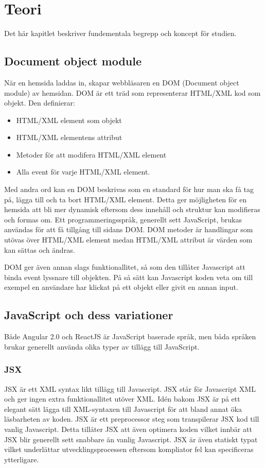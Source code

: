 \section{Teori}
\label{sec:axel-theory}
Det här kapitlet beskriver fundementala begrepp och koncept för studien.

\subsection{Document object module}
När en hemsida laddas in, skapar webbläsaren en DOM (Document object module) av hemsidan. DOM är ett träd som representerar HTML/XML kod som objekt. \cite{w3-htmldom} Den definierar:

\begin{itemize}
\item HTML/XML element som objekt
\item HTML/XML elementens attribut
\item Metoder för att modifera HTML/XML element
\item Alla event för varje HTML/XML element.
\end{itemize} 

Med andra ord kan en DOM beskrivas som en standard för hur man ska få tag på, lägga till och ta bort HTML/XML element. Detta ger möjligheten för en hemsida att bli mer dynamisk eftersom dess innehåll och struktur kan modifieras och formas om. Ett programmeringsspråk, generellt sett JavaScript, brukas användas för att få tillgång till sidans DOM. DOM metoder är handlingar som utövas över HTML/XML element medan HTML/XML attribut är värden som kan sättas och ändras.

DOM ger även annan slags funktionallitet, så som den tillåter Javascript att binda event lyssnare till objekten.\cite{w3-event} På så sätt kan Javascript koden veta om till exempel en användare har klickat på ett objekt eller givit en annan input.


\subsection{JavaScript och dess variationer}
Både Angular 2.0 och ReactJS är JavaScript baserade språk, men båda språken brukar generellt använda olika typer av tillägg till JavaScript.

\subsubsection{JSX}
JSX är ett XML syntax likt tillägg till Javascript. JSX står för Javascript XML och ger ingen extra funktionallitet utöver XML. Idén bakom JSX är på ett elegant sätt lägga till XML-syntaxen till Javascript för att bland annat öka läsbarheten av koden.\cite{react-jsx} JSX är ett preprocessor steg som transpilerar JSX kod till vanlig Javascript. Detta tillåter JSX att även optimera koden vilket innbär att JSX blir generellt sett snabbare än vanlig Javascript.\cite{jsx} \cite{facebook-jsx} JSX är även statiskt typat vilket underlättar utvecklingsprocessen eftersom kompliator fel kan specificeras ytterligare. 

